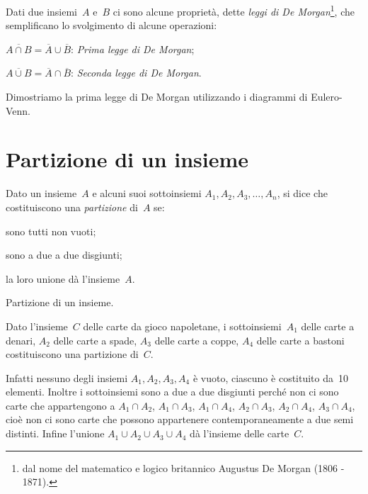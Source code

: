 Dati due insiemi~$A$ e~$B$ ci sono alcune proprietà,
dette \emph{leggi di De Morgan}\footnote{dal nome del matematico e logico britannico Augustus De Morgan (1806 - 1871).}, che semplificano lo svolgimento di alcune operazioni:

\begin{enumeratea}
\item $\overline{A\cap B}=\overline{A}\cup \overline{B}$: \emph{Prima legge di De Morgan};
\item $\overline{A\cup B}=\overline{A}\cap \overline{B}$: \emph{Seconda legge di De Morgan}.
\end{enumeratea}

Dimostriamo la prima legge di De Morgan utilizzando i diagrammi di Eulero-Venn.
\begin{center}
 
\end{center}

\ovalbox{\risolvi \ref{ese:7.27}}

\section{Partizione di un insieme}
\begin{definizione}
Dato un insieme~$A$ e alcuni suoi sottoinsiemi $A_1, A_2, A_3, \ldots, A_n$, si dice che costituiscono una \emph{partizione} di~$A$ se:
\begin{enumeratea}
 \item sono tutti non vuoti;
 \item sono a due a due disgiunti;
 \item la loro unione dà l'insieme~$A$.
\end{enumeratea}
\end{definizione}

\begin{exrig}
 \begin{esempio}
 Partizione di un insieme.

Dato l'insieme~$C$ delle carte da gioco napoletane, i sottoinsiemi~$A_1$ delle carte a denari, $A_2$ delle carte a spade, $A_3$ delle carte a coppe, $A_4$ delle carte a bastoni costituiscono una partizione di~$C$.

Infatti nessuno degli insiemi $A_1, A_2, A_3, A_4$ è vuoto, ciascuno è costituito da~10 elementi. Inoltre i sottoinsiemi sono a due a due disgiunti perché non ci sono carte che appartengono a $A_1 \cap A_2$, $A_1 \cap A_3$, $A_1 \cap A_4$, $A_2 \cap A_3$, $A_2 \cap A_4$, $A_3 \cap A_4$, cioè non ci sono carte che possono appartenere contemporaneamente a due semi distinti. Infine l'unione $A_1\cup A_2 \cup A_3 \cup A_4$ dà l'insieme delle carte~$C$.
 \end{esempio}
\end{exrig}

